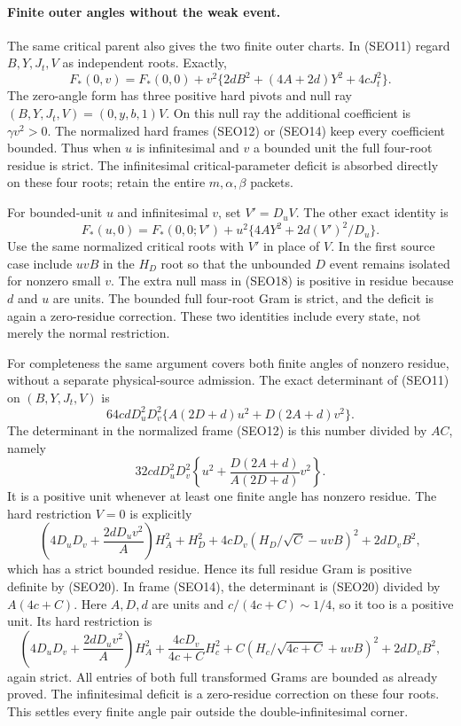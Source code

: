 \paragraph{Finite outer angles without the weak event.}
The same critical parent also gives the two finite outer charts.
In (SEO11) regard $B,Y,J_t,V$ as independent roots. Exactly,
\[
 F_*(0,v)=F_*(0,0)
       +v^2\{2dB^2+(4A+2d)Y^2+4cJ_t^2\}.       \tag{SEO17}
\]
The zero-angle form has three positive hard pivots and null ray
$(B,Y,J_t,V)=(0,y,b,1)V$. On this null ray the additional
coefficient is $\gamma v^2>0$. The normalized hard frames
(SEO12) or (SEO14) keep every coefficient bounded. Thus when
$u$ is infinitesimal and $v$ a bounded unit the full four-root
residue is strict. The infinitesimal critical-parameter deficit
is absorbed directly on these four roots; retain the entire
$m,\alpha,\beta$ packets.

For bounded-unit $u$ and infinitesimal $v$, set $V'=D_uV$.
The other exact identity is
\[
 F_*(u,0)=F_*(0,0;V')
        +u^2\{4AY^2+2d(V')^2/D_u\}.             \tag{SEO18}
\]
Use the same normalized critical roots with $V'$ in place of $V$.
In the first source case include $uvB$ in the $H_D$ root so that
the unbounded $D$ event remains isolated for nonzero small $v$.
The extra null mass in (SEO18) is positive in residue because
$d$ and $u$ are units. The bounded full four-root Gram is strict,
and the deficit is again a zero-residue correction. These two
identities include every state, not merely the normal restriction.

For completeness the same argument covers both finite angles of
nonzero residue, without a separate physical-source admission.
The exact determinant of (SEO11) on $(B,Y,J_t,V)$ is
\[
 64cdD_u^2D_v^2
 \{A(2D+d)u^2+D(2A+d)v^2\}.                    \tag{SEO20}
\]
The determinant in the normalized frame (SEO12) is this number
divided by $AC$, namely
\[
 32cdD_u^2D_v^2
 \left\{u^2+\frac{D(2A+d)}{A(2D+d)}v^2\right\}.
\]
It is a positive unit whenever at least one finite angle has
nonzero residue. The hard restriction $V=0$ is explicitly
\[
 \left(4D_uD_v+\frac{2dD_uv^2}{A}\right)H_A^2
 +H_D^2+4cD_v(H_D/\sqrt C-uvB)^2+2dD_vB^2,
\]
which has a strict bounded residue. Hence its full residue Gram
is positive definite by (SEO20). In frame (SEO14), the determinant
is (SEO20) divided by $A(4c+C)$. Here $A,D,d$ are units and
$c/(4c+C)\sim1/4$, so it too is a positive unit. Its hard
restriction is
\[
 \left(4D_uD_v+\frac{2dD_uv^2}{A}\right)H_A^2
 +\frac{4cD_v}{4c+C}H_c^2
 +C(H_c/\sqrt{4c+C}+uvB)^2+2dD_vB^2,
\]
again strict. All entries of both full transformed Grams are
bounded as already proved. The infinitesimal deficit is a
zero-residue correction on these four roots. This settles every
finite angle pair outside the double-infinitesimal corner.

